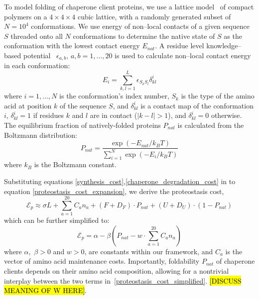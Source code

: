 \documentclass[10pt,letterpaper]{article}
\begin{document}
To model folding of chaperone client proteins, we use a lattice model~\cite{Shakhnovich1990Enumeration,Sikosek2014Biophysics} of compact polymers on a $4\times4\times4$ cubic lattice, with a randomly generated subset of $N=10^{4}$ conformations. We use energy of non--local contacts of a given sequence $S$ threaded onto all $N$ conformations to determine the native state of $S$ as the conformation with the lowest contact energy $E_{nat}$. A residue level knowledge--based potential~\cite{Miyazawa1999SelfConsistent} $\epsilon_{a,b},\, a,b=1,\dots,20$ is used to calculate non--local contact energy in each conformation:
\begin{equation}
	\label{protein_globule_energy}
	E_{i} = \sum\limits_{k,l=1}^{L}\epsilon_{S_{k}S_{l}}\delta^{i}_{kl}
\end{equation}
where $i=1,\dots,N$ is the conformation's index number, $S_{k}$ is the type of the amino acid at position $k$ of the sequence $S$, and $\delta^{i}_{kl}$ is a contact map of the conformation $i$,  $\delta^{i}_{kl}=1$ if residues $k$ and $l$ are in contact ($|k-l|>1$), and $\delta^{i}_{kl}=0$ otherwise. The equilibrium fraction of natively-folded proteins $P_{nat}$ is calculated from the Boltzmann distribution:
\begin{equation}
	\label{pnat_boltzmann}
	P_{nat} = \frac{\exp\left(-E_{nat}/k_{B}T\right)}{\sum\limits_{i=1}^{N}\exp\left(-E_{i}/k_{B}T\right)}
\end{equation}
where $k_{B}$ is the Boltzmann constant. 


Substituting equations \eqref{synthesis_cost},\eqref{chaperone_degradation_cost} in to equation \eqref{proteostasis_cost_expansion}, we derive the proteostasis cost, 
\begin{equation}
	\label{proteostasis_cost_detailed}
	\mathcal{E}_{p} \approx \sigma L + \sum\limits_{a=1}^{20}C_{a}n_{a} + (F+D_{F})\cdot P_{nat} + (U+D_{U})\cdot\left(1-P_{nat}\right)
\end{equation}
which can be further simplified to:
\begin{equation}
	\label{proteostasis_cost_simplified}
	\mathcal{E}_{p} = \alpha - \beta\left(P_{nat} - w\cdot\sum\limits_{a=1}^{20}C_{a}n_{a} \right)
\end{equation}
where $\alpha$,\, $\beta > 0$ and $w>0$, are constants within our framework, and $C_{a}$ is the vector of amino acid maintenance costs. Importantly, foldability $P_{nat}$ of chaperone clients depends on their amino acid composition, allowing for a nontrivial interplay between the two terms in~\eqref{proteostasis_cost_simplified}. \hl{[DISCUSS MEANING OF W HERE]}.
\end{document}
